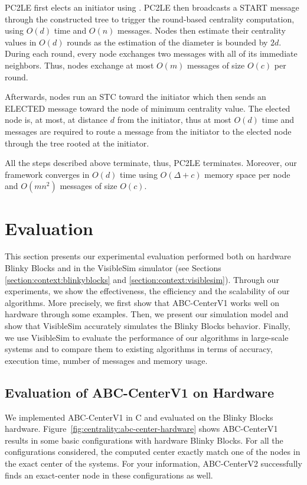 PC2LE first elects an initiator using \cheungIeCbAgg{}. PC2LE then broadcasts a START message through the constructed tree to trigger the round-based centrality computation, using $O(d)$ time and $O(n)$ messages. Nodes then estimate their centrality values in $O(d)$ rounds as the estimation of the diameter is bounded by $2d$. During each round, every node exchanges two messages with all of its immediate neighbors. Thus, nodes exchange at most $O(m)$ messages of size $O(c)$ per round.

Afterwards, nodes run an STC toward the initiator which then sends an ELECTED message toward the node of minimum centrality value. The elected node is, at most, at distance $d$ from the initiator, thus at most $O(d)$ time and messages are required to route a message from the initiator to the elected node through the tree rooted at the initiator.

All the steps described above terminate, thus, PC2LE terminates. Moreover, our framework converges in $O(d)$ time using $O(\Delta + c)$ memory space per node and $O(mn^2)$ messages of size $O(c)$.

\section{Evaluation}
\label{section:centrality:evaluation}

This section presents our experimental evaluation performed both on hardware Blinky Blocks and in the VisibleSim simulator (see Sections \ref{section:context:blinkyblocks} and \ref{section:context:visiblesim}). Through our experiments, we show the effectiveness, the efficiency and the scalability of our algorithms. More precisely, we first show that ABC-CenterV1 works well on hardware through some examples. Then, we present our simulation model and show that VisibleSim accurately simulates the Blinky Blocks behavior. Finally, we use VisibleSim to evaluate the performance of our algorithms in large-scale systems and to compare them to existing algorithms in terms of accuracy, execution time, number of messages and memory usage.

\subsection{Evaluation of ABC-CenterV1 on Hardware}


We implemented ABC-CenterV1 in C and evaluated on the Blinky Blocks hardware. Figure~\ref{fig:centrality:abc-center-hardware} shows ABC-CenterV1 results in some basic configurations with hardware Blinky Blocks. For all the configurations considered, the computed center exactly match one of the nodes in the exact center of the systems. For your information, ABC-CenterV2 successfully finds an exact-center node in these configurations as well.

